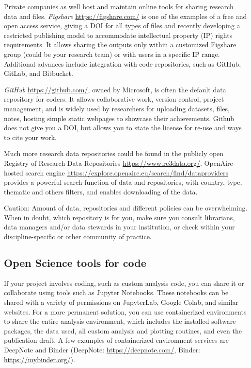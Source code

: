 \documentclass[
  letterpaper,
  DIV=11,
  numbers=noendperiod]{scrreport}
\begin{document}
Private companies as well host and maintain online tools for sharing
research data and files. \emph{Figshare} \url{https://figshare.com/} is
one of the examples of a free and open access service, giving a DOI for
all types of files and recently developing a restricted publishing model
to accommodate intellectual property (IP) rights requirements. It allows
sharing the outputs only within a customized Figshare group (could be
your research team) or with users in a specific IP range. Additional
advances include integration with code repositories, such as GitHub,
GitLab, and Bitbucket.

\emph{GitHub} \url{https://github.com/}, owned by Microsoft, is often
the default data repository for coders. It allows collaborative work,
version control, project management, and is widely used by researchers
for uploading datasets, files, notes, hosting simple static webpages to
showcase their achievements. Github does not give you a DOI, but allows
you to state the license for re-use and ways to cite your work.

Much more research data repositories could be found in the publicly open
Registry of Research Data Repositories \url{https://www.re3data.org/}.
OpenAire-hosted search engine
\url{https://explore.openaire.eu/search/find/dataproviders} provides a
powerful search function of data and repositories, with country, type,
thematic and others filters, and enables downloading of the data.

Caution: Amount of data, repositories and different policies can be
overwhelming. When in doubt, which repository is for you, make sure you
consult librarians, data managers and/or data stewards in your
institution, or check within your discipline-specific or other community
of practice.

\hypertarget{open-science-tools-for-code}{%
\subsection{Open Science tools for
code}\label{open-science-tools-for-code}}

If your project involves coding, such as custom analysis code, you can
share it or collaborate using tools such as Jupyter Notebooks. These
notebooks can be shared with a variety of permissions on JupyterLab,
Google Colab, and similar websites. For a more permanent solution, you
can use containerized environments to share the entire analysis
environment, which includes the installed software packages, the data
used, all custom analysis and plotting routines, and even the
publication draft. A few examples of containerized environment services
are DeepNote and Binder (DeepNote: \url{https://deepnote.com/}, Binder:
\url{https://mybinder.org/}).
\end{document}
